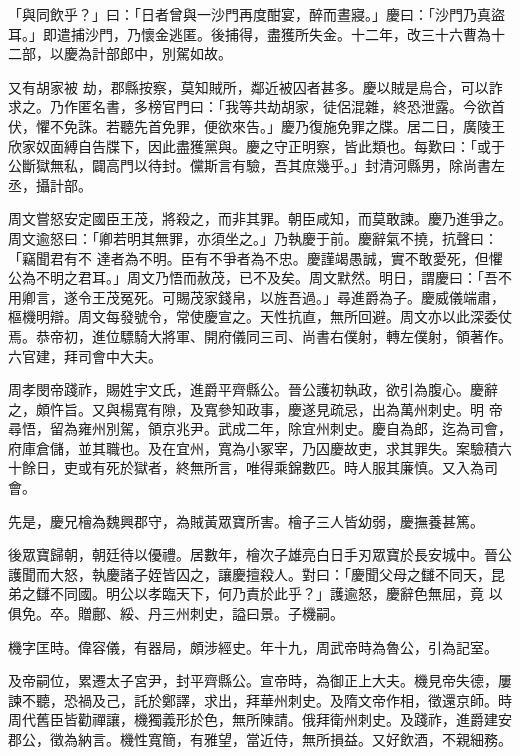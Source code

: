 \begin{pinyinscope}
 「與同飲乎？」曰：「日者曾與一沙門再度酣宴，醉而晝寢。」慶曰：「沙門乃真盜耳。」即遣捕沙門，乃懷金逃匿。後捕得，盡獲所失金。十二年，改三十六曹為十二部，以慶為計部郎中，別駕如故。



 又有胡家被
 劫，郡縣按察，莫知賊所，鄰近被囚者甚多。慶以賊是烏合，可以詐求之。乃作匿名書，多榜官門曰：「我等共劫胡家，徒侶混雜，終恐泄露。今欲首伏，懼不免誅。若聽先首免罪，便欲來告。」慶乃復施免罪之牒。居二日，廣陵王欣家奴面縛自告牒下，因此盡獲黨與。慶之守正明察，皆此類也。每歎曰：「或于公斷獄無私，闢高門以待封。儻斯言有驗，吾其庶幾乎。」封清河縣男，除尚書左丞，攝計部。



 周文嘗怒安定國臣王茂，將殺之，而非其罪。朝臣咸知，而莫敢諫。慶乃進爭之。周文逾怒曰：「卿若明其無罪，亦須坐之。」乃執慶于前。慶辭氣不撓，抗聲曰：「竊聞君有不
 達者為不明。臣有不爭者為不忠。慶謹竭愚誠，實不敢愛死，但懼公為不明之君耳。」周文乃悟而赦茂，已不及矣。周文默然。明日，謂慶曰：「吾不用卿言，遂令王茂冤死。可賜茂家錢帛，以旌吾過。」尋進爵為子。慶威儀端肅，樞機明辯。周文每發號令，常使慶宣之。天性抗直，無所回避。周文亦以此深委仗焉。恭帝初，進位驃騎大將軍、開府儀同三司、尚書右僕射，轉左僕射，領著作。六官建，拜司會中大夫。



 周孝閔帝踐祚，賜姓宇文氏，進爵平齊縣公。晉公護初執政，欲引為腹心。慶辭之，頗忤旨。又與楊寬有隙，及寬參知政事，慶遂見疏忌，出為萬州刺史。明
 帝尋悟，留為雍州別駕，領京兆尹。武成二年，除宜州刺史。慶自為郎，迄為司會，府庫倉儲，並其職也。及在宜州，寬為小冢宰，乃囚慶故吏，求其罪失。案驗積六十餘日，吏或有死於獄者，終無所言，唯得乘錦數匹。時人服其廉慎。又入為司會。



 先是，慶兄檜為魏興郡守，為賊黃眾寶所害。檜子三人皆幼弱，慶撫養甚篤。



 後眾寶歸朝，朝廷待以優禮。居數年，檜次子雄亮白日手刃眾寶於長安城中。晉公護聞而大怒，執慶諸子姪皆囚之，讓慶擅殺人。對曰：「慶聞父母之讎不同天，昆弟之讎不同國。明公以孝臨天下，何乃責於此乎？」護逾怒，慶辭色無屈，竟
 以俱免。卒。贈鄜、綏、丹三州刺史，謚曰景。子機嗣。



 機字匡時。偉容儀，有器局，頗涉經史。年十九，周武帝時為魯公，引為記室。



 及帝嗣位，累遷太子宮尹，封平齊縣公。宣帝時，為御正上大夫。機見帝失德，屢諫不聽，恐禍及己，託於鄭譯，求出，拜華州刺史。及隋文帝作相，徵還京師。時周代舊臣皆勸禪讓，機獨義形於色，無所陳請。俄拜衛州刺史。及踐祚，進爵建安郡公，徵為納言。機性寬簡，有雅望，當近侍，無所損益。又好飲酒，不親細務。




\end{pinyinscope}
